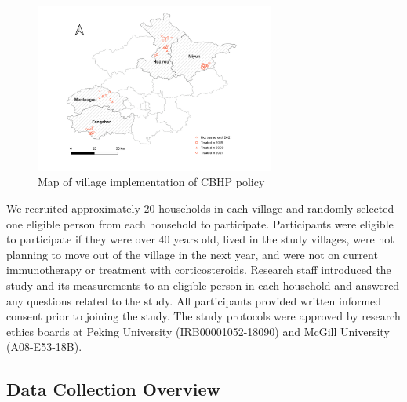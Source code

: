 \documentclass[
  letterpaper,
  DIV=11,
  numbers=noendperiod]{scrartcl}
\begin{document}
\begin{figure}[H]

{\centering \includegraphics[width=0.7\textwidth,height=\textheight]{images/policy-implementation-map.png}

}

\caption{\label{fig-cbhp-map}Map of village implementation of CBHP
policy}

\end{figure}

We recruited approximately 20 households in each village and randomly
selected one eligible person from each household to participate.
Participants were eligible to participate if they were over 40 years
old, lived in the study villages, were not planning to move out of the
village in the next year, and were not on current immunotherapy or
treatment with corticosteroids. Research staff introduced the study and
its measurements to an eligible person in each household and answered
any questions related to the study. All participants provided written
informed consent prior to joining the study. The study protocols were
approved by research ethics boards at Peking University
(IRB00001052-18090) and McGill University (A08-E53-18B).

\hypertarget{data-collection-overview}{%
\subsection{Data Collection Overview}\label{data-collection-overview}}
\end{document}
